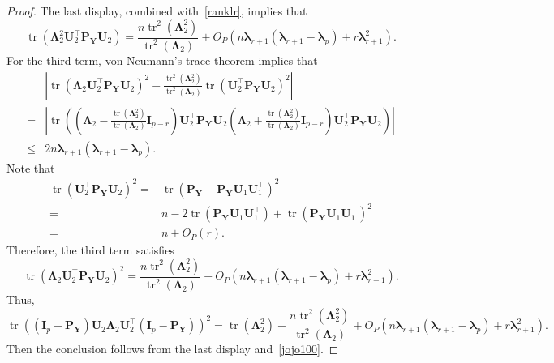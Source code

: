 \documentclass[12pt]{article} %
\DeclareMathOperator{\mytr}{tr}
\newcommand{\bP}{\mathbf{P}}
\newcommand{\bY}{\mathbf{Y}}
\newcommand{\bI}{\mathbf{I}}
\newcommand{\bU}{\mathbf{U}}
\newcommand{\bfsym}[1]{\ensuremath{\boldsymbol{#1}}}
\def\blambda {\bfsym {\lambda}}
\def\bLambda {\bfsym {\Lambda}}
\theoremstyle{definition}
\begin{document}
\begin{appendices}
\begin{proof}
    The last display, combined with~\eqref{ranklr}, implies that
    \begin{equation*}
 \mytr(\bLambda_2^2 \bU_2^\top \bP_\bY \bU_2)
 =
\frac{n\mytr^2(\bLambda_2^2)}{\mytr^2(\bLambda_2)}
+
O_P\left(n\blambda_{r+1}(\blambda_{r+1}-\blambda_p)+r \blambda_{r+1}^2\right).
    \end{equation*}
    For the third term, von Neumann's trace theorem implies that
    \begin{equation*}
        \begin{split}
     &\left|
     \mytr(\bLambda_2 \bU_2^\top \bP_\bY \bU_2)^2
 -
 \frac{\mytr^2(\bLambda_2^2)}{\mytr^2(\bLambda_2)}\mytr( \bU_2^\top \bP_\bY \bU_2)^2
 \right|
 \\
 =
     &\left|
\mytr\left(
\left(\bLambda_2-\frac{\mytr(\bLambda_2^2)}{\mytr(\bLambda_2)}\bI_{p-r}\right) \bU_2^\top \bP_\bY \bU_2
\left(\bLambda_2+\frac{\mytr(\bLambda_2^2)}{\mytr(\bLambda_2)}\bI_{p-r}\right) \bU_2^\top \bP_\bY \bU_2
\right)
 \right|
 \\
 \leq & 2n \blambda_{r+1}(\blambda_{r+1}-\blambda_p).
        \end{split}
    \end{equation*}
    Note that
    \begin{equation*}
        \begin{split}
        \mytr( \bU_2^\top \bP_\bY \bU_2)^2
        =&\mytr\left( \bP_\bY - \bP_\bY\bU_1\bU_1^\top \right)^2
        \\
        =& n- 2\mytr(\bP_\bY\bU_1\bU_1^\top)
        +\mytr(\bP_\bY\bU_1\bU_1^\top)^2
        \\
        =& n+O_P(r)
        .
        \end{split}
    \end{equation*}
    Therefore, the third term satisfies
    \begin{equation*}
     \mytr(\bLambda_2 \bU_2^\top \bP_\bY \bU_2)^2
 =
 \frac{n\mytr^2(\bLambda_2^2)}{\mytr^2(\bLambda_2)}
 +
O_P\left(n\blambda_{r+1}(\blambda_{r+1}-\blambda_p)+r \blambda_{r+1}^2\right).
    \end{equation*}
    Thus,
    \begin{equation*}
        \mytr\left(
         (\bI_p -\bP_\bY)\bU_2 \bLambda_2 \bU_2^\top (\bI_p- \bP_{\bY})
    \right)^2
    =
    \mytr(\bLambda_2^2)-\frac{n\mytr^2(\bLambda_2^2)}{\mytr^2(\bLambda_2)}
 +
O_P\left(n\blambda_{r+1}(\blambda_{r+1}-\blambda_p)+r \blambda_{r+1}^2\right).
    \end{equation*}
    Then the conclusion follows from the last display and~\eqref{jojo100}.
\end{proof}


\end{appendices}
\end{document}
